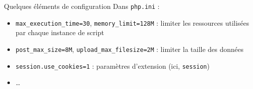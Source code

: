 \begin{frame}{Quelques éléments de configuration}
	Dans \texttt{php.ini} :
	\begin{itemize}
		\item \texttt{max\_execution\_time=30}, \texttt{memory\_limit=128M} : limiter les ressources utilisées par chaque instance de script
		\item \texttt{post\_max\_size=8M}, \texttt{upload\_max\_filesize=2M} : limiter la taille des données
		\item \texttt{session.use\_cookies=1} : paramètres d'extension (ici, \texttt{session})
		\item \ldots
	\end{itemize}
\end{frame}
